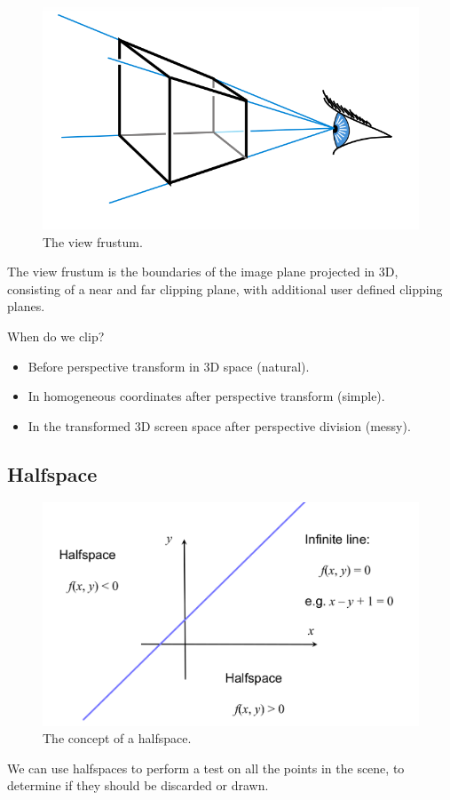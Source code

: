 \documentclass[11pt]{article}
\begin{document}
\begin{figure}[htb!]
  \caption{The view frustum.}
  \includegraphics[scale=0.3]{frustum}
  \centering
\end{figure}

The view frustum is the boundaries of the image plane projected in 3D, consisting of a near and far clipping plane, with additional user defined clipping planes.

When do we clip?
\begin{itemize}
  \item Before perspective transform in 3D space (natural).
  \item In homogeneous coordinates after perspective transform (simple).
  \item In the transformed 3D screen space after perspective division (messy).
\end{itemize}

\subsection{Halfspace}
\begin{figure}[htb!]
  \caption{The concept of a halfspace.}
  \includegraphics[scale=0.3]{halfspace}
  \centering
\end{figure}
We can use halfspaces to perform a test on all the points in the scene, to determine if they should be discarded or drawn.
\end{document}

